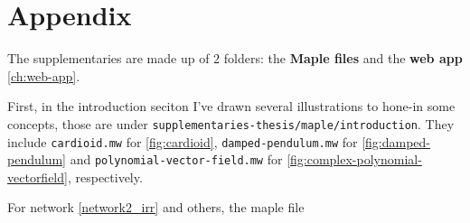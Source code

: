 \chapter*{Appendix}\label{appendix}
The supplementaries are made up of $2$ folders: the \textbf{Maple files} and the \textbf{web app} \ref{ch:web-app}.

First, in the introduction seciton I've drawn several illustrations to hone-in some concepts, those are under \verb|supplementaries-thesis/maple/introduction|. They include \verb|cardioid.mw| for \ref{fig:cardioid}, \verb|damped-pendulum.mw| for \ref{fig:damped-pendulum} and \verb|polynomial-vector-field.mw| for \ref{fig:complex-polynomial-vectorfield}, respectively.

For network \ref{network2_irr} and others, the maple file